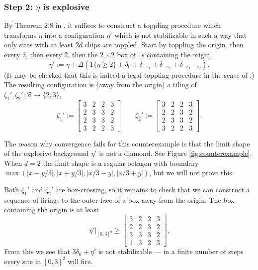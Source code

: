 \documentclass[12pt]{amsart}
\begin{document}
\subsubsection*{Step 2: $\eta$ is explosive}
By Theorem 2.8 in \cite{fey2009stabilizability}, 
it suffices to construct a toppling procedure
which transforms  $\eta$ into a configuration $\eta'$ which is not stabilizable
in such a way that only sites with at least $2 d$ chips are toppled. 
Start by toppling the origin, then every 3, then every 2, then the $2 \times 2$ box of 1s 
containing the origin,
\[
\eta' := \eta + \Delta \left( 1\{\eta \geq 2\} + \delta_0 + \delta_{-e_1} + \delta_{-e_2} + \delta_{-e_1-e_2} \right).
\]
(It may be checked that this is indeed a legal toppling procedure in the sense of \cite{fey2009stabilizability}.)
The resulting configuration is (away from the origin) a tiling of $\zeta_1',\zeta_2' : \mathcal{B} \to \{2, 3\}$, 
\begin{equation} \label{eq:modified_checkerboard}
\zeta_1' := 
\begin{bmatrix}
3 & 2 & 2 & 3 \\
2 & 3 & 3 & 2 \\
2 & 3 & 3 & 2  \\
3 & 2 & 2 & 3
\end{bmatrix}
\qquad 
\zeta_2' := 
\begin{bmatrix}
3 & 2 & 2 & 3 \\
2 & 2 & 3 & 2 \\
2 & 3 & 3 & 2  \\
3 & 2 & 2 & 3
\end{bmatrix}.
\end{equation}
\begin{remark}
	The reason why convergence fails for this counterexample is that the limit 
	shape of the explosive background $\eta'$ is not a diamond. See Figure \ref{fig:counterexample}.
	When $d=2$ the limit shape is a regular octagon with boundary $\max(|x-y/3|, |x+y/3|, |x/3 - y|, |x/3 + y|)$, but we will not prove this. 
\end{remark}

Both $\zeta_1'$ and $\zeta_2'$ are box-crossing, so it remains to check 
that we can construct a sequence of firings to the outer face
of a box away from the origin. The box containing
the origin is at least
\[
\eta'|_{[0,3]^2} \geq
\begin{bmatrix}
3 & 2 & 2 & 3 \\
2 & 2 & 3 & 2 \\
3 & 3 & 3 & 2 \\
1 & 3 & 2 & 3
\end{bmatrix}.
\]
From this we see that $3  \delta_0 + \eta'$ is not stabilizable --- in a finite number of steps every site in $[0,3]^2$ will fire. 
\end{document}
